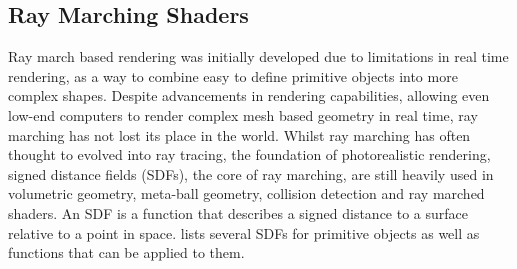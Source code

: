 \documentclass{l4proj}
\begin{document}
\subsection{Ray Marching Shaders}

Ray march based rendering was initially developed due to limitations in real time rendering, as a way to combine easy to define primitive objects into more complex shapes. Despite advancements in rendering capabilities, allowing even low-end computers to render complex mesh based geometry in real time, ray marching has not lost its place in the world. 
Whilst ray marching has often thought to evolved into ray tracing, the foundation of photorealistic rendering, signed distance fields (SDFs), the core of ray marching, are still heavily used in volumetric geometry, meta-ball geometry, collision detection and ray marched shaders.
An SDF is a function that describes a signed distance to a surface relative to a point in space. \citet{quilez_distance_nodate} lists several SDFs for primitive objects as well as functions that can be applied to them.
%
%
\end{document}
